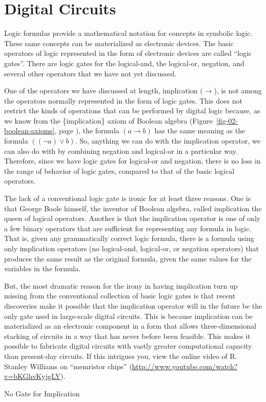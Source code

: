 \section{Digital Circuits}

Logic formulas provide a mathematical notation for concepts in symbolic logic.
These same concepts can be materialized as electronic devices.
The basic operators of logic represented in the form of electronic devices
are called ``logic gates''.
There are logic gates for the logical-and, the logical-or, negation, and
several other operators that we have not yet discussed.

\begin{aside}
One of the operators we have discussed at length, implication
($\rightarrow$), is not among the operators normally represented
in the form of logic gates. This does not restrict the kinds of
operations that can be performed by digital logic because,
as we know from the \{implication\} axiom of Boolean algebra
(Figure~\ref{fig-02-boolean-axioms}, page \pageref{fig-02-boolean-axioms}),
the formula $(a \rightarrow b)$ has the same meaning as the
formula $((\neg a) \vee b)$. So, anything we can do with
the implication operator, we can also do with by combining
negation and logical-or in a particular way.
Therefore, since we have logic gates for logical-or and negation,
there is no loss in the range of behavior of logic
gates, compared to that of the basic logical operators.

The lack of a conventional logic gate is ironic for at least three reasons.
One is that George Boole himself, the inventor of Boolean algebra,
called implication the queen of logical operators.
Another is that the implication operator is one of only a few binary operators
that are sufficient for representing any formula in logic. That is, given
any grammatically correct logic formula, there is a formula using only
implication operators (no logical-and, logical-or, or negation operators)
that produces the same result as the original formula, given the same
values for the variables in the formula.

But, the most dramatic reason for the irony in having implication
turn up missing from the conventional collection of basic logic gates
is that recent discoveries make it possible that the
implication operator will in the future be the only gate used in
large-scale digital circuits.
This is because implication can be materialized
as an electronic component in a form that allows three-dimensional
stacking of circuits in a way that has never before been feasible.
This makes it possible to fabricate digital circuits with vastly greater
computational capacity than present-day circuits.
If this intrigues you, view the online video of
R. Stanley Williams on ``memristor chips''
(\url{http://www.youtube.com/watch?v=bKGhvKyjgLY}).
\caption{No Gate for Implication}
\label{no-implication-gate}
\end{aside}

